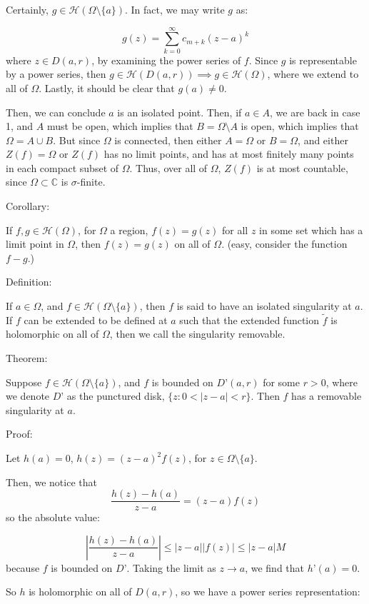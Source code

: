 \documentclass[10pt]{article}
\newcommand{\calH}{\mathcal{H}}
\begin{document}
Certainly, $g \in \calH(\Omega \setminus \{ a \})$. In fact, we may write $g$ as:

$$ g(z) = \sum_{k=0}^\infty c_{m+k} (z-a)^k$$ where $z \in D(a,r)$, by examining the power series of $f$. Since $g$ is representable by a power series, then $g \in \calH(D(a,r)) \implies g \in \calH(\Omega)$, where we extend to all of $\Omega$. Lastly, it should be clear that $g(a) \not = 0$. 

Then, we can conclude $a$ is an isolated point. Then, if $a \in A$, we are back in case 1, and $A$ must be open, which implies that $B = \Omega \setminus A$ is open, which implies that $\Omega = A \cup B$. But since $\Omega$ is connected, then either $A = \Omega$ or $B = \Omega$, and either $Z(f) = \Omega$ or $Z(f)$ has no limit points, and has at most finitely many points in each compact subset of $\Omega$. Thus, over all of $\Omega$, $Z(f)$ is at most countable, since $\Omega \subset \mathbb{C}$ is $\sigma$-finite.

Corollary:

If $f, g \in \calH(\Omega)$, for $\Omega$ a region, $f(z) = g(z)$ for all $z$ in some set which has a limit point in $\Omega$, then $f(z) = g(z)$ on all of $\Omega$. (easy, consider the function $f - g$.)

Definition:

If $a \in \Omega$, and $f \in \calH(\Omega \setminus \{ a \})$, then $f$ is said to have an isolated singularity at $a$. If $f$ can be extended to be defined at $a$ such that the extended function $\tilde{f}$ is holomorphic on all of $\Omega$, then we call the singularity removable.

Theorem:

Suppose $f \in \calH(\Omega \setminus \{ a \})$, and $f$ is bounded on $D’(a,r)$ for some $r > 0$, where we denote $D’$ as the punctured disk, $\{ z : 0 < |z-a| < r \}$. Then $f$ has a removable singularity at $a$. 

Proof:

Let $h(a) = 0$, $h(z) = (z-a)^2 f(z)$, for $z \in \Omega \setminus \{ a \}$. 

Then, we notice that $$ \frac{h(z) - h(a)}{z-a}= (z-a) f(z)$$ so the absolute value:

$$  \left| \frac{h(z) - h(a)}{z-a} \right| \leq |z-a| |f(z)| \leq |z-a| M$$ because $f$ is bounded on $D’$. Taking the limit as $z \to a$, we find that $h’(a) = 0$.

So $h$ is holomorphic on all of $D(a,r)$, so we have a power series representation:
\end{document}
